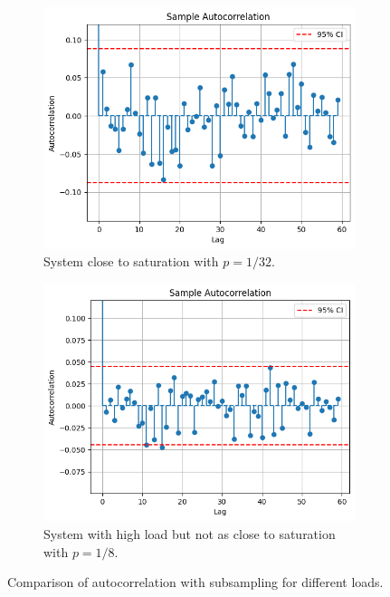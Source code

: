 \vspace{10pt}


\begin{figure}[H]
    \captionsetup{type=figure}
    \centering
    \begin{subfigure}[b]{0.45\textwidth}
        \includegraphics[width=\textwidth]{./images/04/autoCorHighFix.png}
        \caption{System close to saturation with $p=1/32$.}
        \label{fig:autoCorHighFix}
    \end{subfigure}
    \hfill %
    \begin{subfigure}[b]{0.45\textwidth}
        \includegraphics[width=\textwidth]{./images/04/autoCorLowFix.png}
        \caption{System with high load but not as close to saturation with $p=1/8$.}
        \label{fig:autoCorLowFix}
    \end{subfigure}
    \vspace{10pt}
    \caption{Comparison of autocorrelation with subsampling for different loads.}
    \label{fig:autoCorComparisonFix}
\end{figure}